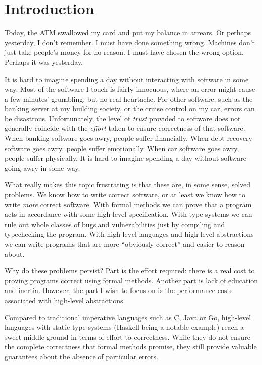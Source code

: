 \chapter{Introduction}
\label{C:introduction}

Today, the ATM swallowed my card and put my balance in arrears.
Or perhaps yesterday, I don't remember.
I must have done something wrong.
Machines don't just take people's money for no reason. 
I must have chosen the wrong option.
Perhaps it was yesterday.

It is hard to imagine spending a day without interacting with software in some way.
Most of the software I touch is fairly innocuous, where an error might cause a few minutes' grumbling, but no real heartache.
For other software, such as the banking server at my building society, or the cruise control on my car, errors can be disastrous.
Unfortunately, the level of \emph{trust} provided to software does not generally coincide with the \emph{effort} taken to ensure correctness of that software.
When banking software goes awry, people suffer financially.
When debt recovery software goes awry, people suffer emotionally.
When car software goes awry, people suffer physically.
It is hard to imagine spending a day without software going awry in some way.

What really makes this topic frustrating is that these are, in some sense, solved problems.
We know how to write correct software, or at least we know how to write \emph{more} correct software.
With formal methods we can prove that a program acts in accordance with some high-level specification.
With type systems we can rule out whole classes of bugs and vulnerabilities just by compiling and typechecking the program.
With high-level languages and high-level abstractions we can write programs that are more ``obviously correct'' and easier to reason about.

Why do these problems persist?
Part is the effort required: there is a real cost to proving programs correct using formal methods.
Another part is lack of education and inertia.
However, the part I wish to focus on is the performance costs associated with high-level abstractions.

Compared to traditional imperative languages such as C, Java or Go, high-level languages with static type systems (Haskell being a notable example) reach a sweet middle ground in terms of effort to correctness.
While they do not ensure the complete correctness that formal methods promise, they still provide valuable guarantees about the absence of particular errors.

